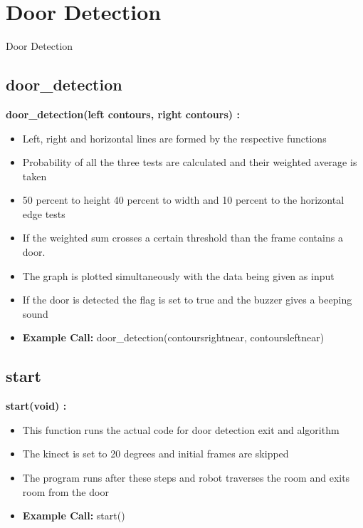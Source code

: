 \documentclass[10pt, a4paper]{beamer}
\begin{document}
\section{Door Detection}
\begin{frame}[allowframebreaks]{Door Detection}
  \subsection{door\_detection}
    \textbf{door\_detection(left contours, right contours) : }
      \begin{itemize}
       \item Left, right and horizontal lines are formed by the respective functions
       \item Probability of all the three tests are calculated and their weighted average is taken
       \item 50 percent to height 40 percent to width and 10 percent to the horizontal edge tests
       \item If the weighted sum crosses a certain threshold than the frame contains a door.
       \item The graph is plotted simultaneously with the data being given as input
       \item If the door is detected the flag is set to true and the buzzer gives a beeping sound
       \item \textbf{Example Call:} door\_detection(contoursrightnear, contoursleftnear)
      \end{itemize}
\framebreak
  \subsection{start}
    \textbf{start(void) : }
      \begin{itemize}
       \item This function runs the actual code for door detection exit and algorithm
       \item The kinect is set to 20 degrees and initial frames are skipped
       \item The program runs after these steps and robot traverses the room and exits room from the door
       \item \textbf{Example Call:} start()
      \end{itemize}
\end{frame}
\end{document}
